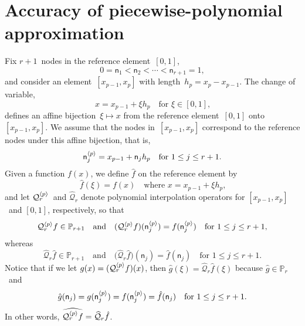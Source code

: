 \section{Accuracy of piecewise-polynomial approximation}
\label{sec: accuracy of interpolation}

Fix $r+1$~nodes in the reference element~$[0,1]$,
\begin{equation}\label{eq: ref nodes 1d}
0=\mathsf{n}_1<\mathsf{n}_2<\cdots<\mathsf{n}_{r+1}=1,
\end{equation}
and consider an element~$[x_{p-1},x_p]$ with length~$h_p=x_p-x_{p-1}$.  The 
change of variable,
\[
x = x_{p-1} + \xi h_p\quad\text{for $\xi\in[0,1]$,}
\]
defines an affine bijection~$\xi\mapsto x$ from the reference element~$[0,1]$ 
onto~$[x_{p-1},x_p]$.  We assume that the nodes in~$[x_{p-1},x_p]$ correspond 
to the reference nodes under this affine bijection, that is,
\[
\mathsf{n}_j^{\langle p\rangle}=x_{p-1}+\mathsf{n}_jh_p\quad\text{for $1\le j\le r+1$.}
\]
Given a function $f(x)$, we define $\hat f$ on the reference element by
\[
\hat f(\xi)=f(x)\quad\text{where $x=x_{p-1}+\xi h_p$,}
\]
and let $\mathcal{Q}_r^{\langle p\rangle}$~and $\widehat{\mathcal{Q}}_r$ denote 
polynomial interpolation operators for $[x_{p-1},x_p]$~and $[0,1]$, 
respectively, so that
\[
\mathcal{Q}_r^{\langle p\rangle}f\in\mathbb{P}_{r+1}\quad\text{and}\quad
(\mathcal{Q}_r^{\langle p\rangle}f)(\mathsf{n}_j^{\langle p\rangle})=f(\mathsf{n}_j^{\langle p\rangle})
\quad\text{for $1\le j\le r+1$,}
\]
whereas
\[
\widehat{\mathcal{Q}}_r\hat f\in\mathbb{P}_{r+1}\quad\text{and}\quad
\bigl(\widehat{\mathcal{Q}}_r\hat f\bigr)(\mathsf{n}_j)=\hat f(\mathsf{n}_j)
\quad\text{for $1\le j\le r+1$.}
\]
Notice that if we let $g(x)=(\mathcal{Q}_r^{\langle p\rangle}f)(x)$, then 
$\hat g(\xi)=\widehat{\mathcal{Q}}_r\hat f(\xi)$ because 
$\hat g\in\mathbb{P}_r$~and 
\[
\hat g(\mathsf{n}_j)=g(\mathsf{n}_j^{\langle p\rangle})=f(\mathsf{n}_j^{\langle p\rangle})
    =\hat f(\mathsf{n}_j)\quad\text{for $1\le j\le r+1$.}
\]
In other words, 
$\widehat{\mathcal{Q}_r^{\langle p\rangle}f}=\widehat{\mathcal{Q}}_r\hat f$.

